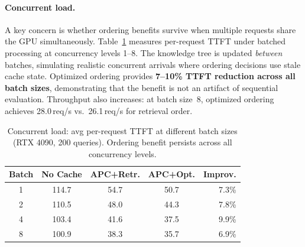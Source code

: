 \documentclass{article}
\begin{document}
\begin{table}[t]
\caption{Cache efficiency: prefill saved per request (RTX 4090, 195 queries, baseline p50 = 116\,ms).}
\label{tab:cache_eff}
\centering
\small
{}
\vspace{-0.5em}
\end{table}

\paragraph{Concurrent load.}
A key concern is whether ordering benefits survive when multiple requests share the GPU simultaneously. Table~\ref{tab:concurrent} measures per-request TTFT under batched processing at concurrency levels 1--8. The knowledge tree is updated \emph{between} batches, simulating realistic concurrent arrivals where ordering decisions use stale cache state. Optimized ordering provides \textbf{7--10\% TTFT reduction across all batch sizes}, demonstrating that the benefit is not an artifact of sequential evaluation. Throughput also increases: at batch size~8, optimized ordering achieves 28.0\,req/s vs.\ 26.1\,req/s for retrieval order.

\begin{table}[t]
\caption{Concurrent load: avg per-request TTFT at different batch sizes (RTX 4090, 200 queries). Ordering benefit persists across all concurrency levels.}
\label{tab:concurrent}
\centering
\small
\begin{tabular}{@{}ccccr@{}}
\toprule
\textbf{Batch} & \textbf{No Cache} & \textbf{APC+Retr.} & \textbf{APC+Opt.} & \textbf{Improv.} \\
\midrule
1 & 114.7 & 54.7 & 50.7 & 7.3\% \\
2 & 110.5 & 48.0 & 44.3 & 7.8\% \\
4 & 103.4 & 41.6 & 37.5 & 9.9\% \\
8 & 100.9 & 38.3 & 35.7 & 6.9\% \\
\bottomrule
\end{tabular}
\vspace{-0.5em}
\end{table}
\end{document}
